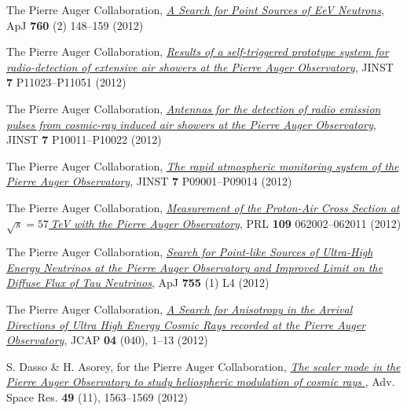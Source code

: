 \begin{etaremune}
\item {}The Pierre Auger Collaboration,
\href{http://dx.doi.org/10.1088/0004-637X/760/2/148}{\emph{A Search for Point
Sources of EeV Neutrons}}, ApJ {\bf{760}} (2) 148--159 (2012)

\item {}The Pierre Auger Collaboration,
\href{http://dx.doi.org/10.1088/1748-0221/7/11/P11023}{\emph{Results of a
self-triggered prototype system for radio-detection of extensive air showers at
the Pierre Auger Observatory}}, JINST {\bf{7}} P11023--P11051 (2012)

\item {}The Pierre Auger Collaboration,
\href{http://dx.doi.org/10.1088/1748-0221/7/10/P10011}{\emph{Antennas for the
detection of radio emission pulses from cosmic-ray induced air showers at the
Pierre Auger Observatory}}, JINST {\bf{7}} P10011--P10022 (2012)

\item {}The Pierre Auger Collaboration,
\href{http://dx.doi.org/10.1088/1748-0221/7/09/P09001}{\emph{The rapid
atmospheric monitoring system of the Pierre Auger Observatory}}, JINST
{\bf{7}} P09001--P09014 (2012)

\item {}The Pierre Auger Collaboration,
\href{http://dx.doi.org/10.1103/PhysRevLett.109.062002}{\emph{Measurement of
the Proton-Air Cross Section at $\sqrt{s}=57$\,TeV with the Pierre Auger
Observatory}}, PRL {\bf{109}} 062002--062011 (2012)

\item {}The Pierre Auger Collaboration,
\href{http://dx.doi.org/10.1088/2041-8205/755/1/L4}{\emph{Search for Point-like
Sources of Ultra-High Energy Neutrinos at the Pierre Auger Observatory and
Improved Limit on the Diffuse Flux of Tau Neutrinos}}, ApJ {\bf{755}} (1) L4
(2012)

\item {}The Pierre Auger Collaboration, 
\href{http://dx.doi.org/10.1088/1475-7516/2012/04/040}{\emph{A Search for
Anisotropy in the Arrival Directions of Ultra High Energy Cosmic Rays recorded
at the Pierre Auger Observatory}}, JCAP {\bf{04}} (040), 1--13 (2012)

\item {}S. Dasso \& H. Asorey, for the Pierre Auger Collaboration,
\href{http://dx.doi.org/10.1016/j.asr.2011.12.028}{\emph{ The scaler mode in
the Pierre Auger Observatory to study heliospheric modulation of cosmic rays
}}, Adv. Space Res. {\bf{49}} (11), 1563--1569 (2012)


\end{etaremune}
